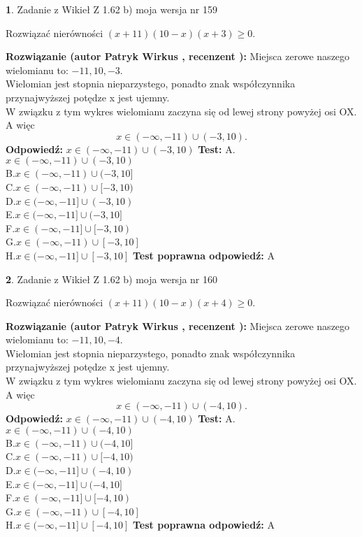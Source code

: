 \documentclass[12pt, a4paper]{article}
\theoremstyle{definition} %
\newtheorem{zad}{}
\newcommand{\zadStart}[1]{\begin{zad}#1\newline}
\newcommand{\zadStop}{\end{zad}}
\newcommand{\rozwStart}[2]{\noindent \textbf{Rozwiązanie (autor #1 , recenzent #2): }\newline}
\newcommand{\rozwStop}{\newline}
\newcommand{\odpStart}{\noindent \textbf{Odpowiedź:}\newline}
\newcommand{\odpStop}{\newline}
\newcommand{\testStart}{\noindent \textbf{Test:}\newline}
\newcommand{\testStop}{\newline}
\newcommand{\kluczStart}{\noindent \textbf{Test poprawna odpowiedź:}\newline}
\newcommand{\kluczStop}{\newline}
\begin{document}
\zadStart{Zadanie z Wikieł Z 1.62 b) moja wersja nr 159}

Rozwiązać nierówności $(x+11)(10-x)(x+3)\ge0$.
\zadStop
\rozwStart{Patryk Wirkus}{}
Miejsca zerowe naszego wielomianu to: $-11, 10, -3$.\\
Wielomian jest stopnia nieparzystego, ponadto znak współczynnika przy\linebreak najwyższej potędze x jest ujemny.\\ W związku z tym wykres wielomianu zaczyna się od lewej strony powyżej osi OX. A więc $$x \in (-\infty,-11) \cup (-3,10).$$
\rozwStop
\odpStart
$x \in (-\infty,-11) \cup (-3,10)$
\odpStop
\testStart
A.$x \in (-\infty,-11) \cup (-3,10)$\\
B.$x \in (-\infty,-11) \cup (-3,10]$\\
C.$x \in (-\infty,-11) \cup [-3,10)$\\
D.$x \in (-\infty,-11] \cup (-3,10)$\\
E.$x \in (-\infty,-11] \cup (-3,10]$\\
F.$x \in (-\infty,-11] \cup [-3,10)$\\
G.$x \in (-\infty,-11) \cup [-3,10]$\\
H.$x \in (-\infty,-11] \cup [-3,10]$
\testStop
\kluczStart
A
\kluczStop



\zadStart{Zadanie z Wikieł Z 1.62 b) moja wersja nr 160}

Rozwiązać nierówności $(x+11)(10-x)(x+4)\ge0$.
\zadStop
\rozwStart{Patryk Wirkus}{}
Miejsca zerowe naszego wielomianu to: $-11, 10, -4$.\\
Wielomian jest stopnia nieparzystego, ponadto znak współczynnika przy\linebreak najwyższej potędze x jest ujemny.\\ W związku z tym wykres wielomianu zaczyna się od lewej strony powyżej osi OX. A więc $$x \in (-\infty,-11) \cup (-4,10).$$
\rozwStop
\odpStart
$x \in (-\infty,-11) \cup (-4,10)$
\odpStop
\testStart
A.$x \in (-\infty,-11) \cup (-4,10)$\\
B.$x \in (-\infty,-11) \cup (-4,10]$\\
C.$x \in (-\infty,-11) \cup [-4,10)$\\
D.$x \in (-\infty,-11] \cup (-4,10)$\\
E.$x \in (-\infty,-11] \cup (-4,10]$\\
F.$x \in (-\infty,-11] \cup [-4,10)$\\
G.$x \in (-\infty,-11) \cup [-4,10]$\\
H.$x \in (-\infty,-11] \cup [-4,10]$
\testStop
\kluczStart
A
\kluczStop
\end{document}
